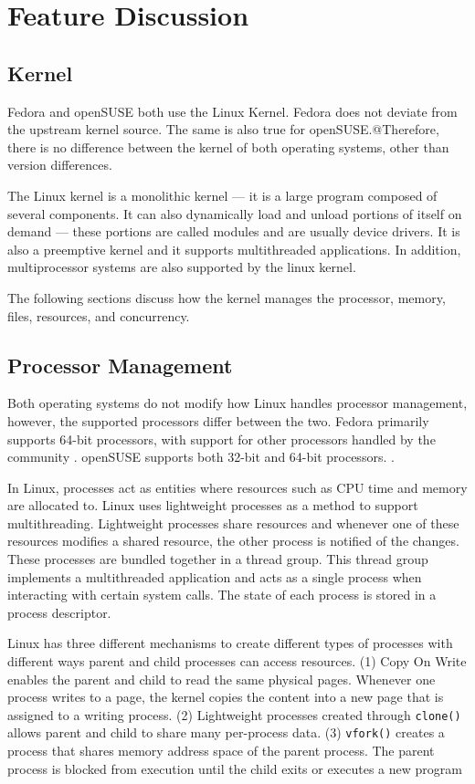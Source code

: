 \documentclass{article}
\begin{document}
\section{Feature Discussion}
\subsection{Kernel}
Fedora and openSUSE both use the Linux Kernel. Fedora does not deviate from the
upstream kernel source. The same is also true for openSUSE.@Therefore, there is
no difference between the kernel of both operating systems, other than version
differences.

The Linux kernel is a monolithic kernel --- it is a large program composed of
several components. It can also dynamically load and unload portions of itself
on demand --- these portions are called modules and are usually device drivers. It
is also a preemptive kernel and it supports multithreaded applications. In
addition, multiprocessor systems are also supported by the linux kernel.
\parencite[3]{linux}

The following sections discuss how the kernel manages the processor, memory,
files, resources, and concurrency.

\subsection{Processor Management}
Both operating systems do not modify how Linux handles processor management,
however, the supported processors differ between the two. Fedora primarily
supports 64-bit processors, with support for other processors handled by the
community \parencite{fedora_arch}. openSUSE supports both 32-bit and 64-bit
processors. \parencite{opensuse_arch}.

In Linux, processes act as entities where resources such as CPU time and memory
are allocated to. Linux uses lightweight processes as a method to support
multithreading. Lightweight processes share resources and whenever one of these
resources modifies a shared resource, the other process is notified of the
changes. These processes are bundled together in a thread group. This thread
group implements a multithreaded application and acts as a single process when
interacting with certain system calls. The state of each process is stored in a
process descriptor. \parencite[79-81]{linux}

Linux has three different mechanisms to create different types of processes with
different ways parent and child processes can access resources. (1) Copy On
Write enables the parent and child to read the same physical pages. Whenever one
process writes to a page, the kernel copies the content into a new page that is
assigned to a writing process. (2) Lightweight processes created through
\texttt{clone()} allows parent and child to share many per-process data. (3)
\texttt{vfork()} creates a process that shares memory address space of the
parent process. The parent process is blocked from execution until the child
exits or executes a new program \parencite[114-115]{linux}
\end{document}
